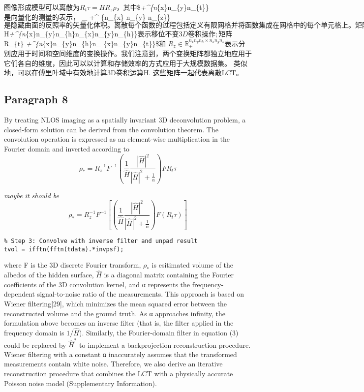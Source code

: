 \documentclass[11pt]{article}
\begin{document}
图像形成模型可以离散为\(R_t\tau=HR_z\rho\)，其中\$\tau \in {}\emph{+\^{}\{n}\{x\}n\_\{y\}n\_\{t\}\}
\(是向量化的 测量的表示，\) \rho \in {} \_ +\^{} \{n\_\{x\}
n\_\{y\} n\_\{z\}\}
\(是隐藏曲面的反照率的矢量化体积。 离散每个函数的过程包括定义有限网格并将函数集成在网格中的每个单元格上。矩阵\)
H\in {}\emph{+\^{}\{n}\{x\}n\_\{y\}n\_\{h\}\times n\_\{x\}n\_\{y\}n\_\{h\}\}\(表示移位不变3D卷积操作;矩阵\)R\_\{t\}
\in {} \emph{+\^{}\{n}\{x\}n\_\{y\}n\_\{h\}\times n\_
\{x\}n\_\{y\}n\_\{t\}\}\$和
\(R_z \in \mathbb {R}_+^{n_{x}n_{y}n_{h} \times n_{x}n_{y}n_{z}}\)表示分别应用于时间和空间维度的变换操作。我们注意到，两个变换矩阵都独立地应用于它们各自的维度，因此可以以计算和存储效率的方式应用于大规模数据集。
类似地，可以在傅里叶域中有效地计算3D卷积运算H. 这些矩阵一起代表离散LCT。

    \subsection{Paragraph 8}\label{paragraph-8}

By treating NLOS imaging as a spatially invariant 3D deconvolution
problem, a closed-form solution can be derived from the convolution
theorem. The convolution operation is expressed as an element-wise
multiplication in the Fourier domain and inverted according to
\[\rho_{\ast}=R_{z}^{-1}F^{-1}(\frac{1}{\widehat{H}}\frac{|\widehat{H}|^{2}}{|\widehat{H}|^{2}+\frac{1}{\alpha}})FR_{t}\tau\]

\emph{maybe it should be}
\[\rho_{\ast}=R_{z}^{-1}F^{-1}[(\frac{1}{\widehat{H}}\frac{|\widehat{H}|^{2}}{|\widehat{H}|^{2}+\frac{1}{\alpha}})F(R_{t}\tau)]\]

\begin{verbatim}
% Step 3: Convolve with inverse filter and unpad result
tvol = ifftn(fftn(tdata).*invpsf);
\end{verbatim}

where F is the 3D discrete Fourier transform, \(\rho_{\ast}\) is
esitimated volume of the albedos of the hidden surface, \(\hat{H}\) is a
diagonal matrix containing the Fourier coefficients of the 3D
convolution kernel, and α represents the frequency-dependent
signal-to-noise ratio of the measurements. This approach is based on
Wiener filtering{[}29{]}, which minimizes the mean squared error between
the reconstructed volume and the ground truth. As α approaches infinity,
the formulation above becomes an inverse filter (that is, the filter
applied in the frequency domain is \(1/\hat{H}\)). Similarly, the
Fourier-domain filter in equation (3) could be replaced by
\(\hat{H}^{\ast}\) to implement a backprojection reconstruction
procedure. Wiener filtering with a constant α inaccurately assumes that
the transformed measurements contain white noise. Therefore, we also
derive an iterative reconstruction procedure that combines the LCT with
a physically accurate Poisson noise model (Supplementary Information).
\end{document}
